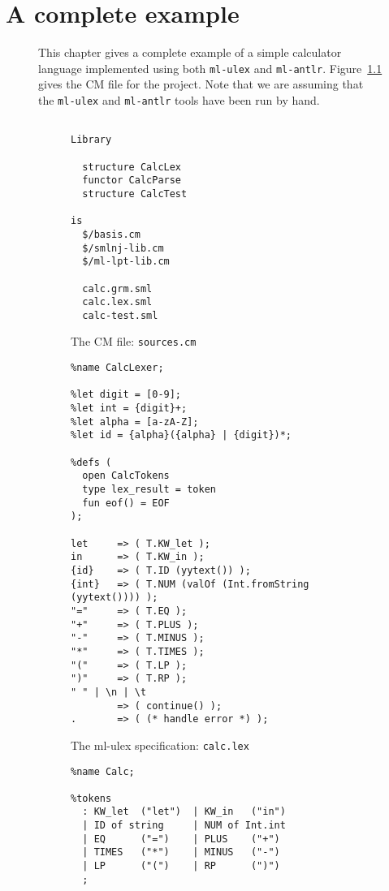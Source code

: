 %
\chapter{A complete example}
\label{ch:example}

\begin{figure}[h]
This chapter gives a complete example of a simple calculator
language implemented using both \texttt{ml-ulex} and \texttt{ml-antlr}.
Figure~\ref{fig:calc-sources} gives the CM file for the project.
Note that we are assuming that the \texttt{ml-ulex} and \texttt{ml-antlr}
tools have been run by hand.
\begin{figure}[h]
\begin{verbatim}

Library

  structure CalcLex
  functor CalcParse
  structure CalcTest

is
  $/basis.cm
  $/smlnj-lib.cm
  $/ml-lpt-lib.cm

  calc.grm.sml
  calc.lex.sml
  calc-test.sml

\end{verbatim}
\caption{The CM file: {\tt sources.cm}}
\label{fig:calc-sources}
\end{figure}

\begin{figure}

\begin{verbatim}
%name CalcLexer;

%let digit = [0-9];
%let int = {digit}+;
%let alpha = [a-zA-Z];
%let id = {alpha}({alpha} | {digit})*;

%defs (
  open CalcTokens
  type lex_result = token
  fun eof() = EOF
);

let     => ( T.KW_let );
in      => ( T.KW_in );
{id}    => ( T.ID (yytext()) );
{int}   => ( T.NUM (valOf (Int.fromString (yytext()))) );
"="     => ( T.EQ );
"+"     => ( T.PLUS );
"-"     => ( T.MINUS );
"*"     => ( T.TIMES );
"("     => ( T.LP );
")"     => ( T.RP );
" " | \n | \t
        => ( continue() );
.       => ( (* handle error *) );
\end{verbatim}
\caption{The ml-ulex specification: {\tt calc.lex}}
\label{fig:calc-lex}
\end{figure}

\begin{figure}[p]
\begin{verbatim}
%name Calc;

%tokens
  : KW_let  ("let")  | KW_in   ("in")
  | ID of string     | NUM of Int.int
  | EQ      ("=")    | PLUS    ("+")
  | TIMES   ("*")    | MINUS   ("-")
  | LP      ("(")    | RP      (")")
  ;
  

\end{verbatim}
\end{figure}
\end{figure}
